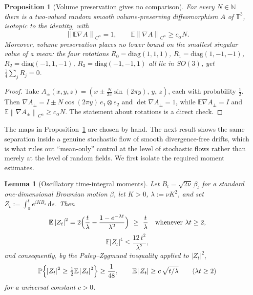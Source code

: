 \documentclass[11pt,reqno]{amsart}
\newcommand{\T}{\mathbb{T}}
\newcommand{\E}{\mathbb{E}}
\newcommand{\Pp}{\mathbb{P}}
\newcommand{\dd}{\,\mathrm{d}}
\newcommand{\norm}[1]{\left\lVert #1\right\rVert}
\newcommand{\abs}[1]{\left\lvert #1\right\rvert}
\newtheorem{proposition}[theorem]{Proposition}
\newtheorem{lemma}[theorem]{Lemma}
\theoremstyle{definition}
\begin{document}
\begin{proposition}[Volume preservation gives no comparison]\label{prop:jensen}
For every $N\in\mathbb N$ there is a two-valued random smooth volume-preserving
diffeomorphism $A$ of $\T^3$, isotopic to the identity, with
\[
  \norm{\E\nabla A}_{C^\alpha}=1,\qquad
  \E\norm{\nabla A}_{C^\alpha}\ge c_\alpha N .
\]
Moreover, volume preservation places no lower bound on the smallest singular value of a
mean: the four rotations
$R_0=\mathrm{diag}(1,1,1)$, $R_1=\mathrm{diag}(1,-1,-1)$, $R_2=\mathrm{diag}(-1,1,-1)$,
$R_3=\mathrm{diag}(-1,-1,1)$ all lie in $SO(3)$, yet $\tfrac14\sum_jR_j=0$.
\end{proposition}

\begin{proof}
Take $A_\pm(x,y,z)=(x\pm\tfrac{N}{2\pi}\sin(2\pi y),\,y,\,z)$, each with probability
$\tfrac12$. Then $\nabla A_\pm=I\pm N\cos(2\pi y)\,e_1\otimes e_2$ and
$\det\nabla A_\pm=1$, while $\E\nabla A_\pm=I$ and
$\E\norm{\nabla A_\pm}_{C^\alpha}\ge c_\alpha N$. The statement about rotations is a direct
check.
\end{proof}

The maps in Proposition~\ref{prop:jensen} are chosen by hand. The next result shows the
same separation inside a genuine stochastic flow of smooth divergence-free drifts, which
is what rules out ``mean-only'' control at the level of stochastic flows rather than
merely at the level of random fields. We first isolate the required moment estimates.

\begin{lemma}[Oscillatory time-integral moments]\label{lem:Z}
Let $B_t=\sqrt{2\nu}\,\beta_t$ for a standard one-dimensional Brownian motion $\beta$, let
$K>0$, $\lambda:=\nu K^2$, and set $Z_t:=\int_0^t e^{iKB_s}\dd s$. Then
\begin{equation}\label{eq:Z2}
  \E\abs{Z_t}^2=2\Bigl(\frac{t}{\lambda}-\frac{1-e^{-\lambda t}}{\lambda^2}\Bigr)
  \ \ge\ \frac{t}{\lambda}\quad\text{whenever }\lambda t\ge2 ,
\end{equation}
\begin{equation}\label{eq:Z4}
  \E\abs{Z_t}^4\le\frac{12\,t^2}{\lambda^2},
\end{equation}
and consequently, by the Paley--Zygmund inequality applied to $\abs{Z_t}^2$,
\begin{equation}\label{eq:Zlower}
  \Pp\Bigl\{\abs{Z_t}^2\ge\tfrac12\E\abs{Z_t}^2\Bigr\}\ge\frac1{48},
  \qquad
  \E\abs{Z_t}\ge c\,\sqrt{t/\lambda}\qquad(\lambda t\ge2)
\end{equation}
for a universal constant $c>0$.
\end{lemma}
\end{document}
